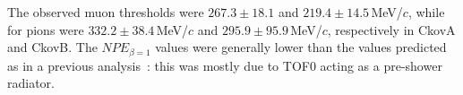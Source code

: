 The observed muon thresholds were $267.3\pm18.1$ and $219.4\pm14.5$\,MeV/$c$, while for pions were $332.2\pm38.4$\,MeV/$c$ and $295.9\pm95.9$\,MeV/$c$, respectively in CkovA and CkovB. The $NPE_{\beta=1}$ values were generally lower than the values predicted as in a previous analysis~\cite{NOTE473}: this was mostly due to TOF0 acting as a pre-shower radiator.


